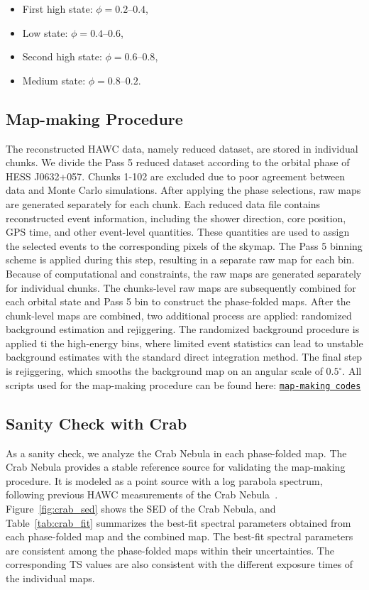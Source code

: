 \documentclass[10pt,letter]{article}
\begin{document}
\begin{itemize}
    \item First high state:
    $\phi = 0.2$--$0.4$,

    \item Low state:
    $\phi = 0.4$--$0.6$,

    \item Second high state:
    $\phi = 0.6$--$0.8$,

    \item Medium state:
    $\phi = 0.8$--$0.2$.
\end{itemize}


\subsection{Map-making Procedure}
The reconstructed HAWC data, namely reduced dataset, are stored in individual chunks. We divide the Pass 5 reduced dataset according to the orbital phase of HESS J0632+057. Chunks 1-102 are excluded due to poor agreement between data and Monte Carlo simulations. After applying the phase selections, raw maps are generated separately for each chunk. Each reduced data file contains reconstructed event information, including the shower direction, core position, GPS time, and other event-level quantities. These quantities are used to assign the selected events to the corresponding pixels of the skymap. The Pass 5 binning scheme is applied during this step, resulting in a separate raw map for each bin. Because of computational and constraints, the raw maps are generated separately for individual chunks. The chunks-level raw maps are subsequently combined for each orbital state and Pass 5 bin to construct the phase-folded maps. After the chunk-level maps are combined, two additional process are applied: randomized background estimation and rejiggering.
The randomized background procedure is applied ti the high-energy bins, where limited event statistics can lead to unstable background estimates with the standard direct integration method. The final step is rejiggering, which smooths the background map on an angular scale of $0.5^\circ$. All scripts used for the map-making procedure can be found here: \href{https://gitlab.com/hawc-observatory/sandboxes/kyoungjh}{\texttt{map-making codes}}

\subsection{Sanity Check with Crab}
As a sanity check, we analyze the Crab Nebula in each phase-folded map. The Crab Nebula provides a stable reference source for validating the map-making procedure. It is modeled as a point source with a log parabola spectrum, following previous HAWC measurements of the Crab Nebula~\citep{Abeysekara2019, Albert2024}. Figure~\ref{fig:crab_sed} shows the SED of the Crab Nebula, and Table~\ref{tab:crab_fit} summarizes the best-fit spectral parameters obtained from each phase-folded map and the combined map. The best-fit spectral parameters are consistent among the phase-folded maps within their uncertainties. The corresponding TS values are also consistent with the different exposure times of the individual maps.
\end{document}
